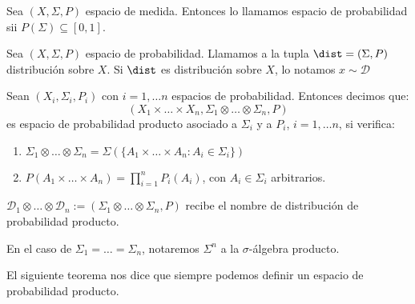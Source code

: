 \begin{definition}
 Sea $(X, \Sigma, P)$ espacio de medida. Entonces lo llamamos espacio de probabilidad sii $P(\Sigma)\subseteq [0,1]$.
\end{definition}


\begin{definition}
 Sea $(X, \Sigma, P)$ espacio de probabilidad. Llamamos a la tupla $\dist = (\Sigma,P)$ distribución sobre $X$. 
 Si $\dist$ es distribución sobre $X$, lo notamos $x\sim \mathcal{D}$
\end{definition}

\begin{definition}
 Sean $(X_i, \Sigma_i, P_i)$ con $i=1,\ldots n$ espacios de probabilidad. Entonces decimos que:
 \[(X_1 \times \ldots \times X_n, \Sigma_1 \otimes \ldots \otimes \Sigma_n, P)\] es
 espacio de probabilidad producto asociado a $\Sigma_i$ y a $P_i$, $i=1, \ldots n$, si verifica:
 
 \begin{enumerate}[i]
  \item $\Sigma_1 \otimes \ldots \otimes \Sigma_n = \Sigma\left(\{A_1 \times \ldots \times A_n: A_i\in \Sigma_i\}\right)$
  \item $P(A_1 \times \ldots \times A_n) = \prod_{i=1}^n P_i(A_i)$, con $A_i\in \Sigma_i$ arbitrarios.
 \end{enumerate}
 
 $\mathcal{D}_1 \otimes \ldots \otimes \mathcal{D}_n := (\Sigma_1 \otimes \ldots \otimes \Sigma_n, P)$ recibe 
 el nombre de distribución de probabilidad producto.
 
 En el caso de $\Sigma_1 = \ldots = \Sigma_n$, notaremos $\Sigma^n$ a la $\sigma$-álgebra producto.
\end{definition}

El siguiente teorema nos dice que siempre podemos definir un espacio de probabilidad producto.

